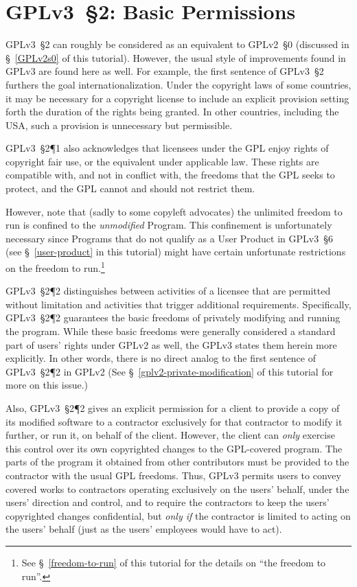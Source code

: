 \section{GPLv3~\S2: Basic Permissions}
\label{GPLv3S2}

GPLv3~\S2 can roughly be considered as an equivalent to GPLv2~\S0 (discussed
in \S~\ref{GPLv2s0} of this tutorial).  However, the usual style of
improvements found in GPLv3 are found here as well.  For example, the first
sentence of GPLv3~\S2 furthers the goal internationalization.  Under the
copyright laws of some countries, it may be necessary for a copyright license
to include an explicit provision setting forth the duration of the rights
being granted. In other countries, including the USA, such a provision is
unnecessary but permissible.

GPLv3~\S2\P1 also acknowledges that licensees under the GPL enjoy rights of
copyright fair use, or the equivalent under applicable law.  These rights are
compatible with, and not in conflict with, the freedoms that the GPL seeks to
protect, and the GPL cannot and should not restrict them.

However, note that (sadly to some copyleft advocates) the unlimited freedom
to run is confined to the \textit{unmodified} Program.  This confinement is
unfortunately necessary since Programs that do not qualify as a User Product
in GPLv3~\S6 (see \S~\ref{user-product} in this tutorial) might have certain
unfortunate restrictions on the freedom to run.\footnote{See
  \S~\ref{freedom-to-run} of this tutorial for the details on ``the freedom to
  run''.}

GPLv3~\S2\P2 distinguishes between activities of a licensee that are
permitted without limitation and activities that trigger additional
requirements.  Specifically, GPLv3~\S2\P2 guarantees the basic freedoms of
privately modifying and running the program.  While these basic freedoms were
generally considered a standard part of users' rights under GPLv2 as well,
the GPLv3 states them herein more explicitly.  In other words, there is no
direct analog to the first sentence of GPLv3~\S2\P2 in GPLv2
(See \S~\ref{gplv2-private-modification} of this tutorial for more on this issue.)

Also, GPLv3~\S2\P2 gives an explicit permission for a client to provide a
copy of its modified software to a contractor exclusively for that contractor
to modify it further, or run it, on behalf of the client.  However, the
client can \textit{only} exercise this control over its own copyrighted
changes to the GPL-covered program.  The parts of the program it obtained
from other contributors must be provided to the contractor with the usual GPL
freedoms.  Thus, GPLv3 permits users to convey covered works to contractors
operating exclusively on the users' behalf, under the users' direction and
control, and to require the contractors to keep the users' copyrighted
changes confidential, but \textit{only if} the contractor is limited to acting
on the users' behalf (just as the users' employees would have to act).

